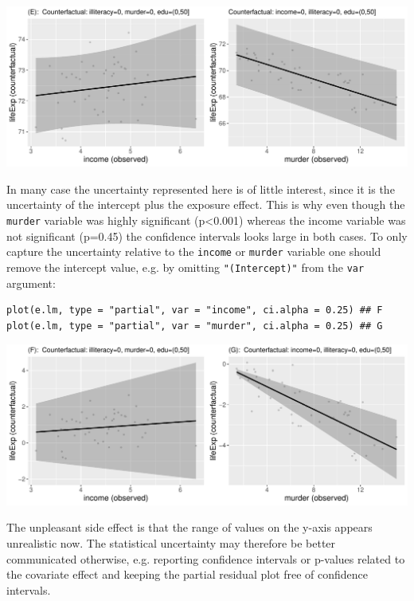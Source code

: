 \documentclass[12pt]{article}
\begin{document}
\begin{center}
\includegraphics[trim={0 0 0 0},width=1\textwidth]{./figures/gg-lmpres-cifit.pdf}
\end{center}

In many case the uncertainty represented here is of little interest,
since it is the uncertainty of the intercept plus the exposure
effect. This is why even though the \texttt{murder} variable was highly
significant (p<0.001) whereas the income variable was not significant
(p=0.45) the confidence intervals looks large in both cases. To only
capture the uncertainty relative to the \texttt{income} or \texttt{murder} variable
one should remove the intercept value, e.g. by omitting
\texttt{"(Intercept)"} from the \texttt{var} argument:
\lstset{language=r,label= ,caption= ,captionpos=b,numbers=none}
\begin{lstlisting}
plot(e.lm, type = "partial", var = "income", ci.alpha = 0.25) ## F
plot(e.lm, type = "partial", var = "murder", ci.alpha = 0.25) ## G
\end{lstlisting}
\begin{center}
\includegraphics[trim={0 0 0 0},width=1\textwidth]{./figures/gg-lmpres-cicov.pdf}
\end{center}

The unpleasant side effect is that the range of values on the y-axis
appears unrealistic now. The statistical uncertainty may therefore be
better communicated otherwise, e.g. reporting confidence intervals or
p-values related to the covariate effect and keeping the partial
residual plot free of confidence intervals.
\end{document}
